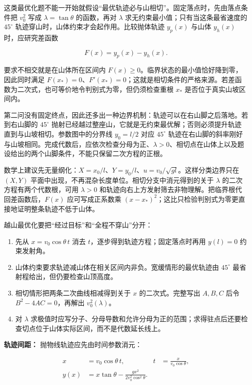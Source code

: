 \documentclass[12pt,a4paper,UTF8]{ctexart}
\newcommand{\tightlist}{\setlength{\itemsep}{0pt}\setlength{\parskip}{0pt}}
\begin{document}
这类最优化题不能一开始就假设``最优轨迹必与山相切''。固定落点时，先由落点条件把
\(v_0^2\) 写成 \(\lambda=\tan\theta\) 的函数，再对 \(\lambda\)
求无约束最小值；只有当这条最省速度的 \(45^\circ\)
轨迹穿山时，山体约束才会起作用。比较抛体轨迹 \(y_p(x)\) 与山体
\(y_h(x)\) 时，应研究差函数

\[F(x)=y_p(x)-y_h(x).\]

要求不相交就是在山体所在区间内
\(F(x)\geqslant0\)。临界状态的最小值恰好降到零，因此同时满足
\(F(x_*)=0\)、\(F'(x_*)=0\)；这就是相切条件的严格来源。若差函数为二次式，也可等价地令判别式为零，但仍须检查重根
\(x_*\) 是否位于真实山坡区间内。

第二问没有固定终点，因此还多出一种边界机制：轨迹可以在右山脚之后落地。若到右山脚的
\(45^\circ\)
抛射已经越过整座山，它就是无约束最优解；否则必须提升轨迹直到与山坡相切。参数图中的分界线
\(y_0=l/2\) 对应 \(45^\circ\)
轨迹在右山脚的斜率刚好与山坡相同。完成代数后，应依次检查分母为正、\(\lambda>0\)、相切点在山体上以及题设给出的两个山脚条件，不能只保留二次方程的正根。

数学上建议先无量纲化：\(X=x_0/l\)、\(Y=y_0/l\)、\(u=v_0/\sqrt{gl}\)。这样分类边界只在
\((X,Y)\) 平面中出现，不再混杂长度单位。相切分支中消元得到的关于
\(\lambda\) 的二次方程有两个代数根，可用 \(\lambda>0\)
和轨迹向右上方发射筛去非物理解。把临界根代回差函数后，\(F(x)\)
应可写成正系数乘
\((x-x_*)^2\)；这比只检验判别式为零更直接地证明整条轨迹不低于山体。

越山最优化要把``经过目标''和``全程不穿山''分开：

\begin{enumerate}
\def\labelenumi{\arabic{enumi}.}
\tightlist
\item
  先从 \(x=v_0\cos\theta\,t\) 消去
  \(t\)，逐步得到轨迹方程；固定落点时再用 \(y(l)=0\) 约束发射角。
\item
  山体约束要求轨迹减山体在相关区间内非负。宽缓情形的最优轨迹由
  \(45^\circ\) 最省射程给出，但仍要检查山顶高度。
\item
  相切情形把两条二次曲线相减得到关于 \(x\) 的二次式。完整写出 \(A,B,C\)
  后令 \(B^2-4AC=0\)，再解出 \(v_0^2(\lambda)\)。
\item
  对 \(\lambda\)
  求极值时应写分子、分母导数和允许分母为正的范围；求得驻点后还要检查切点位于山体实际区间，而不是代数延长线上。
\end{enumerate}

\textbf{轨迹间距：} 抛物线轨迹应先由时间参数消元：

\[\begin{aligned}
x&=v_0\cos\theta\,t,
&t&=\frac{x}{v_0\cos\theta},\\
y(x)&=x\tan\theta-
\frac{gx^2}{2v_0^2\cos^2\theta}.
\end{aligned}\]
\end{document}
